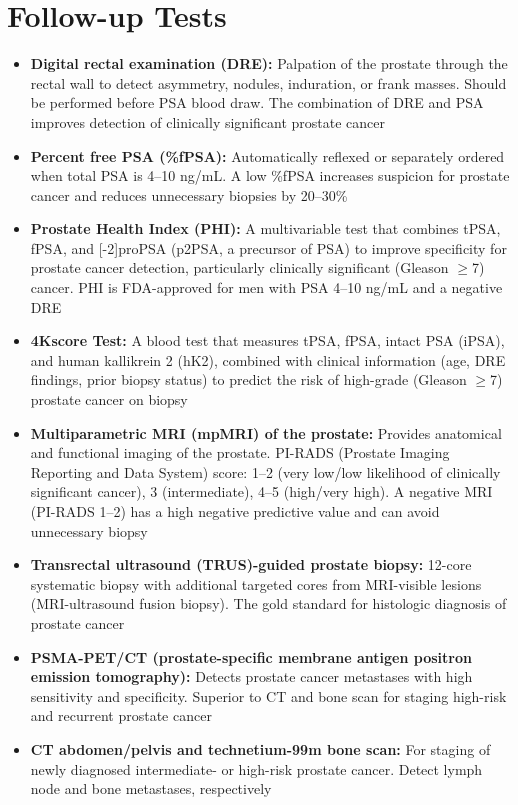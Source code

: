 \section*{Follow-up Tests}
\begin{itemize}
  \item \textbf{Digital rectal examination (DRE):} Palpation of the prostate through the rectal wall to detect asymmetry, nodules, induration, or frank masses. Should be performed before PSA blood draw. The combination of DRE and PSA improves detection of clinically significant prostate cancer
  \item \textbf{Percent free PSA (\%fPSA):} Automatically reflexed or separately ordered when total PSA is 4--10 ng/mL. A low \%fPSA increases suspicion for prostate cancer and reduces unnecessary biopsies by 20--30\%
  \item \textbf{Prostate Health Index (PHI):} A multivariable test that combines tPSA, fPSA, and [-2]proPSA (p2PSA, a precursor of PSA) to improve specificity for prostate cancer detection, particularly clinically significant (Gleason $\geq$7) cancer. PHI is FDA-approved for men with PSA 4--10 ng/mL and a negative DRE
  \item \textbf{4Kscore Test:} A blood test that measures tPSA, fPSA, intact PSA (iPSA), and human kallikrein 2 (hK2), combined with clinical information (age, DRE findings, prior biopsy status) to predict the risk of high-grade (Gleason $\geq$7) prostate cancer on biopsy
  \item \textbf{Multiparametric MRI (mpMRI) of the prostate:} Provides anatomical and functional imaging of the prostate. PI-RADS (Prostate Imaging Reporting and Data System) score: 1--2 (very low/low likelihood of clinically significant cancer), 3 (intermediate), 4--5 (high/very high). A negative MRI (PI-RADS 1--2) has a high negative predictive value and can avoid unnecessary biopsy
  \item \textbf{Transrectal ultrasound (TRUS)-guided prostate biopsy:} 12-core systematic biopsy with additional targeted cores from MRI-visible lesions (MRI-ultrasound fusion biopsy). The gold standard for histologic diagnosis of prostate cancer
  \item \textbf{PSMA-PET/CT (prostate-specific membrane antigen positron emission tomography):} Detects prostate cancer metastases with high sensitivity and specificity. Superior to CT and bone scan for staging high-risk and recurrent prostate cancer
  \item \textbf{CT abdomen/pelvis and technetium-99m bone scan:} For staging of newly diagnosed intermediate- or high-risk prostate cancer. Detect lymph node and bone metastases, respectively
\end{itemize}

